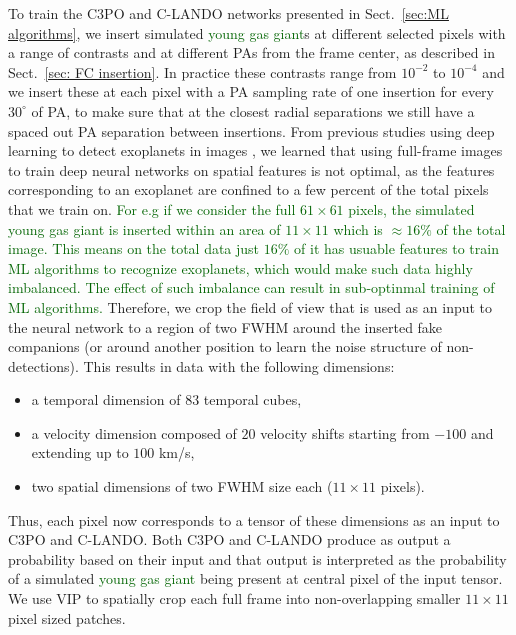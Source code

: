 \documentclass{aa}
\newcommand{\newchange}[1]{\textcolor{darkgreen}{#1}}
\begin{document}
To train the C3PO and C-LANDO networks presented in Sect.~\ref{sec:ML algorithms}, we insert simulated \newchange{young gas giant}s at different selected pixels with a range of contrasts and at different PAs from the frame center, as described in Sect.~\ref{sec: FC insertion}.
In practice these contrasts range from $10^{-2}$ to $10^{-4}$ and we insert these at each pixel with a PA sampling rate of one insertion for every $30^{\circ}$ of PA, to make sure that at the closest radial separations we still have a spaced out PA separation between insertions. 
From previous studies using deep learning to detect exoplanets in images \citep[e.g.,][]{2018Gomez,2023Carlito}, we learned that using full-frame images to train deep neural networks on spatial features is not optimal, as the features corresponding to an exoplanet are confined to a few percent of the total pixels that we train on. 
\newchange{For e.g if we consider the full $61\times61$ pixels, the simulated \newchange{young gas giant} is inserted within an area of $11\times11$ which is $\approx 16\%$ of the total image.
This means on the total data just $16\%$ of it has usuable features to train ML algorithms to recognize exoplanets, which would make such data highly imbalanced.
The effect of such imbalance can result in sub-optinmal training of ML algorithms.}
Therefore, we crop the field of view that is used as an input to the neural network to a region of two FWHM around the inserted fake companions (or around another position to learn the noise structure of non-detections).
This results in data with the following dimensions:
\begin{itemize}
    \item a temporal dimension of $83$ temporal cubes, 
    \item a velocity dimension composed of $20$ velocity shifts starting from $-100$ and extending up to $100$ km/s, 
    \item two spatial dimensions of two FWHM size each ($11\times 11$ pixels).
\end{itemize}
Thus, each pixel now corresponds to a tensor of these dimensions as an input to C3PO and C-LANDO.
Both C3PO and C-LANDO produce as output a probability based on their input and that output is interpreted as the probability of a simulated \newchange{young gas giant} being present at central pixel of the input tensor.
We use VIP to spatially crop each full frame into non-overlapping smaller $11\times11$ pixel sized patches.
\end{document}
